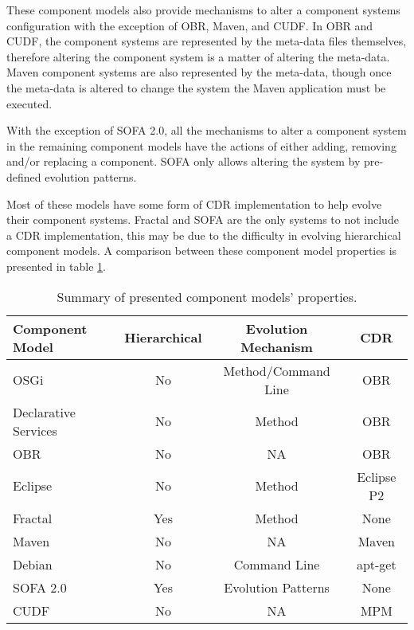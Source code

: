 These component models also provide mechanisms to alter a component systems configuration with the exception of OBR, Maven, and CUDF.
In OBR and CUDF, the component systems are represented by the meta-data files themselves, therefore altering the component system is a matter of altering the meta-data. 
Maven component systems are also represented by the meta-data, though once the meta-data is altered to change the system the Maven application must be executed.

With the exception of SOFA 2.0, all the mechanisms to alter a component system in the remaining component models have the actions of either adding, removing and/or replacing a component.
SOFA only allows altering the system by pre-defined evolution patterns.

Most of these models have some form of CDR implementation to help evolve their component systems.
Fractal and SOFA are the only systems to not include a CDR implementation, this may be due to the difficulty in evolving hierarchical component models.
A comparison between these component model properties is presented in table \ref{background.comparisonprop}.

\begin{table}
\begin{tabular}{|l || c | c | c | }
\hline \textbf{Component Model}& \textbf{Hierarchical}& \textbf{Evolution Mechanism}	& \textbf{CDR}\\\hline

OSGi					& No			& Method/Command Line 					& OBR\\
Declarative Services	& No			& Method 								& OBR\\
OBR						& No			& NA									& OBR \\
Eclipse					& No			& Method								& Eclipse P2\\
Fractal					& Yes			& Method 								& None\\
Maven					& No			& NA 									& Maven\\
Debian					& No			& Command Line 							& apt-get\\
SOFA 2.0				& Yes			& Evolution Patterns 					& None\\
CUDF					& No			& NA 									& MPM\\\hline
\end{tabular}
\caption{Summary of presented component models' properties.}
\label{background.comparisonprop}
\end{table}

